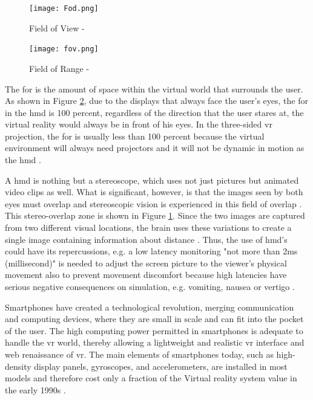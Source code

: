 \begin{figure}[ht]
    \centering
    \texttt{[image: Fod.png]}
    \caption{Field of View - \citep{William}}
    \label{fig:field}
\end{figure}


\begin{figure}[ht]
    \centering
    \texttt{[image: fov.png]}
    \caption{Field of Range - \citep{William}}
    \label{fig:fod}
\end{figure}

The \acrfull{for} is the amount of space within the virtual world that surrounds the user. As shown in Figure \ref{fig:fod}, due to the displays that always face the user's eyes, the \acrshort{for} in the \acrshort{hmd} is 100 percent, regardless of the direction that the user stares at, the virtual reality would always be in front of his eyes. In the three-sided \acrshort{vr} projection, the \acrshort{for} is usually less than 100 percent because the virtual environment will always need projectors and it will not be dynamic in motion as the \acrlong{hmd} \citep{William}.

A \acrlong{hmd} is nothing but a stereoscope, which uses not just pictures but animated video clips as well. What is significant, however, is that the images seen by both eyes must overlap and stereoscopic vision is experienced in this field of overlap \citep{Vince2011}.
This stereo-overlap zone is shown in Figure \ref{fig:field}. Since the two images are captured from two different visual locations, the brain uses these variations to create a single image containing information about distance \citep{Vince2011}. Thus, the use of \acrshort{hmd}'s could have its repercussions, e.g. a low latency monitoring "not more than 2ms (millisecond)" is needed to adjust the screen picture to the viewer's physical movement also to prevent movement discomfort because high latencies have serious negative consequences on simulation, e.g. vomiting, nausea or vertigo \citep{burdea2017virtual, Vince2011, Steinicke2016}.

Smartphones have created a technological revolution, merging communication and computing devices, where they are small in scale and can fit into the pocket of the user. The high computing power permitted in smartphones is adequate to handle the \acrshort{vr} world, thereby allowing a lightweight and realistic \acrshort{vr} interface and web renaissance of \acrshort{vr}. The main elements of smartphones today, such as high-density display panels, gyroscopes, and accelerometers, are installed in most models and therefore cost only a fraction of the Virtual reality system value in the early 1990s \citep{Steinicke2016}. 




